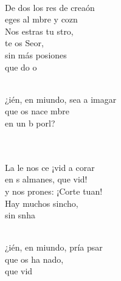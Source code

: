 \documentclass[12pt]{article}
\begin{document}
\begin{multicols*}{2}
\begin{cancion}
	  \\
\jump
	De dos los res de  creaón\\
	eges al mbre y  cozn \\
	Nos estras tu stro, \\
	te os Seor,\\
	sin más posiones \\
	que do  o \\\jump\\
	\begin{chorus}%
	¿ién, en miundo, sea a imagar \\
	que os nace mbre\\
	en un b porl?  \\
	\end{chorus}%
	\jump\\
	   \\
	La le nos ce ¡vid a corar\\
	en s almanes, que  vid! \\
	y  nos prones: ¡Corte tuan! \\
	Hay muchos sincho, \\
	sin snha\\\jump\\
	\begin{chorus}%
	¿ién, en miundo, pría psar \\
	que os ha nado,\\
	que  vid \\

\end{chorus}
\end{cancion}
\end{multicols*}
\end{document}
